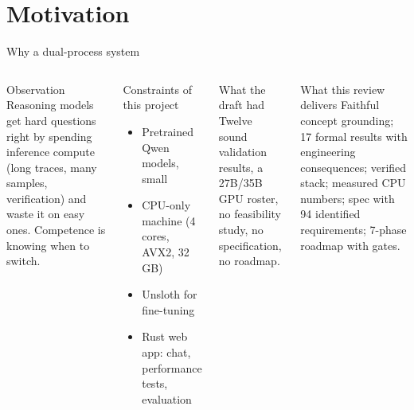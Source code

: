 \documentclass[aspectratio=169,10pt]{beamer}
\begin{document}
\section{Motivation}
\begin{frame}{Why a dual-process system}
\begin{columns}[T]
\begin{block}{Observation}
Reasoning models get hard questions right by spending inference compute (long traces, many samples, verification) and waste it on easy ones. Competence is knowing when to switch.
\end{block}
\begin{block}{Constraints of this project}
\begin{itemize}\item Pretrained Qwen models, small \item CPU-only machine (4 cores, AVX2, 32\,GB) \item Unsloth for fine-tuning \item Rust web app: chat, performance tests, evaluation\end{itemize}
\end{block}
\begin{exampleblock}{What the draft had}
Twelve sound validation results, a 27B/35B GPU roster, no feasibility study, no specification, no roadmap.
\end{exampleblock}
\begin{exampleblock}{What this review delivers}
Faithful concept grounding; 17 formal results with engineering consequences; verified stack; measured CPU numbers; spec with 94 identified requirements; 7-phase roadmap with gates.
\end{exampleblock}
\end{columns}
\end{frame}
\end{document}
